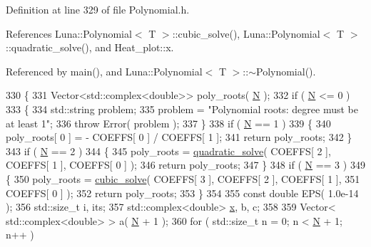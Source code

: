 Definition at line 329 of file Polynomial.\+h.



References Luna\+::\+Polynomial$<$ T $>$\+::cubic\+\_\+solve(), Luna\+::\+Polynomial$<$ T $>$\+::quadratic\+\_\+solve(), and Heat\+\_\+plot\+::x.



Referenced by main(), and Luna\+::\+Polynomial$<$ T $>$\+::$\sim$\+Polynomial().


\begin{DoxyCode}
330     \{
331         Vector<std::complex<double>> poly\_roots( \hyperlink{namespaceHeat__plot_a7d050092798e28458a263710837bda77}{N} );
332         \textcolor{keywordflow}{if} ( \hyperlink{namespaceHeat__plot_a7d050092798e28458a263710837bda77}{N} <= 0 )
333         \{
334             std::string problem;
335             problem = \textcolor{stringliteral}{"Polynomial roots: degree must be at least 1"};
336             \textcolor{keywordflow}{throw} Error( problem );
337         \}
338         \textcolor{keywordflow}{if} ( \hyperlink{namespaceHeat__plot_a7d050092798e28458a263710837bda77}{N} == 1 )
339         \{
340             poly\_roots[ 0 ] = - COEFFS[ 0 ] / COEFFS[ 1 ];
341             \textcolor{keywordflow}{return} poly\_roots;
342         \}
343         \textcolor{keywordflow}{if} ( \hyperlink{namespaceHeat__plot_a7d050092798e28458a263710837bda77}{N} == 2 )
344         \{
345             poly\_roots = \hyperlink{classLuna_1_1Polynomial_a801a06a8f76a415ce1368daea1c77abb}{quadratic\_solve}( COEFFS[ 2 ], COEFFS[ 1 ], COEFFS[ 0 ] );
346             \textcolor{keywordflow}{return} poly\_roots;
347         \}
348         \textcolor{keywordflow}{if} ( \hyperlink{namespaceHeat__plot_a7d050092798e28458a263710837bda77}{N} == 3 )
349         \{
350             poly\_roots = \hyperlink{classLuna_1_1Polynomial_aaef399eff187c6a97b1931186c60035f}{cubic\_solve}( COEFFS[ 3 ], COEFFS[ 2 ], COEFFS[ 1 ],
351                                                                 COEFFS[ 0 ] );
352             \textcolor{keywordflow}{return} poly\_roots;
353         \}
354 
355         \textcolor{keyword}{const} \textcolor{keywordtype}{double} EPS( 1.0e-14 );
356         std::size\_t i, its;
357         std::complex<double> \hyperlink{namespaceHeat__plot_aa88370c16b85b784ccbde3ed88bc1991}{x}, b, c;
358 
359         Vector< std::complex<double> > a( \hyperlink{namespaceHeat__plot_a7d050092798e28458a263710837bda77}{N} + 1 );
360         \textcolor{keywordflow}{for} ( std::size\_t n = 0; n < \hyperlink{namespaceHeat__plot_a7d050092798e28458a263710837bda77}{N} + 1; n++ )

\end{DoxyCode}
